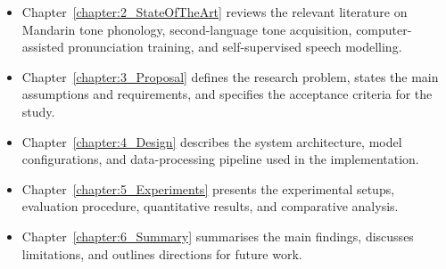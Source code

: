 \begin{itemize}
  \item Chapter~\ref{chapter:2_StateOfTheArt} reviews the relevant literature on Mandarin tone phonology, second-language tone acquisition, computer-assisted pronunciation training, and self-supervised speech modelling.
  \item Chapter~\ref{chapter:3_Proposal} defines the research problem, states the main assumptions and requirements, and specifies the acceptance criteria for the study.
  \item Chapter~\ref{chapter:4_Design} describes the system architecture, model configurations, and data-processing pipeline used in the implementation.
  \item Chapter~\ref{chapter:5_Experiments} presents the experimental setups, evaluation procedure, quantitative results, and comparative analysis.
  \item Chapter~\ref{chapter:6_Summary} summarises the main findings, discusses limitations, and outlines directions for future work.
\end{itemize}
